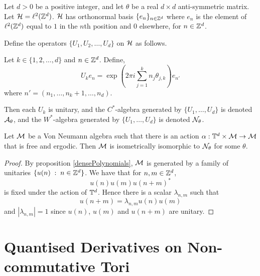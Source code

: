\begin{definition}
    Let $d > 0$ be a positive integer, and let $\theta$ be a
    real $d\times d$ anti-symmetric matrix. Let $\mathcal{H} = \ell^2(\mathbb{Z}^d)$.
    $\mathcal{H}$ has orthonormal basis $\{e_n\}_{n \in \mathbb{Z}^d}$
    where $e_n$ is the element of $\ell^2(\mathbb{Z}^d)$ equal to $1$
    in the $n$th position and $0$ elsewhere, for $n \in \mathbb{Z}^d$. 
    
     Define
    the operators $\{U_1,U_2,\ldots,U_d\}$ on $\mathcal{H}$ as follows.
    
    Let $k \in \{1,2,\ldots,d\}$ and $n \in \mathbb{Z}^d$. Define,
    \begin{equation*}
        U_k e_n = \exp\left(2\pi i \sum_{j=1}^k n_j\theta_{j,k}\right)e_{n'}
    \end{equation*} 
    where $n' = (n_1,\ldots,n_k+1,\ldots,n_d)$.
    
    Then each $U_k$ is unitary, and the $C^*$-algebra
    generated by $\{U_1,\ldots,U_d\}$ is denoted $\mathcal{A}_\theta$,
    and the $W^*$-algebra generated by $\{U_1,\ldots,U_d\}$ is denoted
    $\mathcal{N}_\theta$.
\end{definition}


\begin{proposition}
    Let $\mathcal{M}$ be a Von Neumann algebra such that there is an action
    $\alpha:\mathbb{T}^d\times \mathcal{M}\to\mathcal{M}$ that is free and ergodic. Then $\mathcal{M}$
    is isometrically isomorphic to $\mathcal{N}_\theta$ for some $\theta$.
\end{proposition}
\begin{proof}
    By proposition \ref{densePolynomials}, $\mathcal{M}$ is generated
    by a family of unitaries $\{u(n)\;:\;n \in \mathbb{Z}^d\}$. We have that
    for $n,m \in \mathbb{Z}^d$,
    \begin{equation}
        u(n)u(m)u(n+m)^*
    \end{equation}
    is fixed under the action of $\mathbb{T}^d$. Hence there is a scalar $\lambda_{n,m}$
    such that
    \begin{equation}
        u(n+m) = \lambda_{n,m}u(n)u(m)
    \end{equation}
    and $|\lambda_{n,m}| = 1$ since $u(n)$, $u(m)$ and $u(n+m)$
    are unitary.
    
\end{proof}

\section{Quantised Derivatives on Non-commutative Tori}

